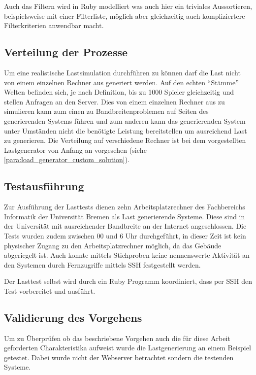 \documentclass[10pt]{scrartcl}
\begin{document}
  Auch das Filtern wird in Ruby modelliert was auch hier ein triviales Aussortieren, beispielsweise mit einer Filterliste, möglich aber gleichzeitig auch kompliziertere Filterkriterien anwendbar macht.
  
  \subsection{Verteilung der Prozesse}
  Um eine realistische Lastsimulation durchführen zu können darf die Last nicht von einem einzelnen Rechner aus generiert werden. Auf den echten ``Stämme'' Welten befinden sich, je nach Definition, bis zu 1000 Spieler gleichzeitig und stellen Anfragen an den Server. Dies von einem einzelnen Rechner aus zu simulieren kann zum einen zu Bandbreitenproblemen auf Seiten des generierenden Systems führen und zum anderen kann das generierenden System unter Umständen nicht die benötigte Leistung bereitstellen um ausreichend Last zu generieren.
  Die Verteilung auf verschiedene Rechner ist bei dem vorgestellten Lastgenerator von Anfang an vorgesehen (siehe \ref{para:load_generator_custom_solution}).
  
  
  \subsection{Testausführung}
  Zur Ausführung der Lasttests dienen zehn Arbeitsplatzrechner des Fachbereichs Informatik der Universität Bremen als Last generierende Systeme. Diese sind in der Universität mit ausreichender Bandbreite an der Internet angeschlossen. Die Tests wurden zudem zwischen 00 und 6 Uhr durchgeführt, in dieser Zeit ist kein physischer Zugang zu den Arbeitsplatzrechner möglich, da das Gebäude abgeriegelt ist. Auch konnte mittels Stichproben keine nennenswerte Aktivität an den Systemen durch Fernzugriffe mittels SSH festgestellt werden.
  
  Der Lasttest selbst wird durch ein Ruby Programm koordiniert, dass per SSH den Test vorbereitet und ausführt.
  
  \subsection{Validierung des Vorgehens}
  Um zu Überprüfen ob das beschriebene Vorgehen auch die für diese Arbeit geforderten Charakteristika aufweist wurde die Lastgenerierung an einem Beispiel getestet. Dabei wurde nicht der Webserver betrachtet sondern die testenden Systeme.
  
\end{document}
